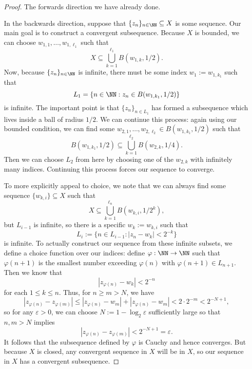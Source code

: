 \begin{proof}
	The forwards direction we have already done.

	In the backwards direction, suppose that $\{z_n\}_{n\in\NN}\subseteq X$ is some sequence. Our main goal is to construct a convergent subsequence. Because $X$ is bounded, we can choose $w_{1,1},\ldots,w_{1,\ell_1}$ such that
	\[X\subseteq\bigcup_{k=1}^{\ell_1}B(w_{1,k},1/2).\]
	Now, because $\{z_n\}_{n\in\NN}$ is infinite, there must be some index $w_1:=w_{1,k_1}$ such that
	\[L_1=\{n\in\NN:z_n\in B(w_{1,k_1},1/2)\}\]
	is infinite. The important point is that $\{z_n\}_{n\in L_1}$ has formed a subsequence which lives inside a ball of radius $1/2$. We can continue this process: again using our bounded condition, we can find some $w_{2,1},\ldots,w_{2,\ell_2}\in B(w_{1,k_1},1/2)$ such that
	\[B(w_{1,k_1},1/2)\subseteq\bigcup_{k=1}^{\ell_2}B(w_{2,k},1/4).\]
	Then we can choose $L_2$ from here by choosing one of the $w_{2,k}$ with infinitely many indices. Continuing this process forces our sequence to converge.

	To more explicitly appeal to choice, we note that we can always find some sequence $\{w_{k,i}\}\subseteq X$ such that
	\[X\subseteq\bigcup_{k=1}^{\ell_n}B(w_{k,i},1/2^k),\]
	but $L_{i-1}$ is infinite, so there is a specific $w_k:=w_{k,i}$ such that
	\[L_i:=\{n\in L_{i-1}:|z_n-w_{k}|<2^{-k}\}\]
	is infinite. To actually construct our sequence from these infinite subsets, we define a choice function over our indices: define $\varphi:\NN\to\NN$ such that $\varphi(n+1)$ is the smallest number exceeding $\varphi(n)$ with $\varphi(n+1)\in L_{n+1}$. Then we know that
	\[|z_{\varphi(n)}-w_{k}|<2^{-n}\]
	for each $1\le k\le n$. Thus, for $n\ge m>N$, we have
	\[|z_{\varphi(n)}-z_{\varphi(m)}|\le|z_{\varphi(n)}-w_m|+|z_{\varphi(n)}-w_m|<2\cdot2^{-m}<2^{-N+1},\]
	so for any $\varepsilon>0$, we can choose $N:=1-\log_2\varepsilon$ sufficiently large so that $n,m>N$ implies
	\[|z_{\varphi(n)}-z_{\varphi(m)}|<2^{-N+1}=\varepsilon.\]
	It follows that the subsequence defined by $\varphi$ is Cauchy and hence converges. But because $X$ is closed, any convergent sequence in $X$ will be in $X$, so our sequence in $X$ has a convergent subsequence.
\end{proof}